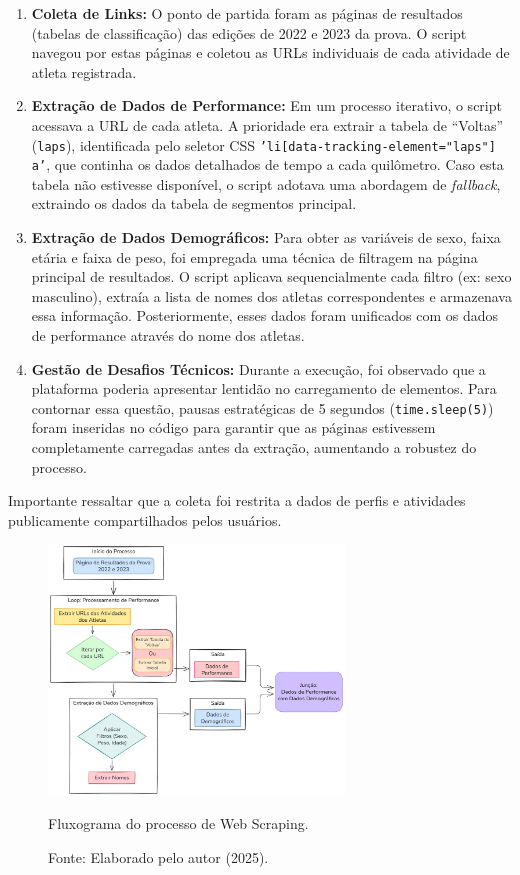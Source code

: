 \begin{enumerate}
    \item \textbf{Coleta de Links:} O ponto de partida foram as páginas de resultados (tabelas de classificação) das edições de 2022 e 2023 da prova. O script navegou por estas páginas e coletou as URLs individuais de cada atividade de atleta registrada.
    
    \item \textbf{Extração de Dados de Performance:} Em um processo iterativo, o script acessava a URL de cada atleta. A prioridade era extrair a tabela de ``Voltas'' (\texttt{laps}), identificada pelo seletor CSS \texttt{'li[data-tracking-element="laps"] a'}, que continha os dados detalhados de tempo a cada quilômetro. Caso esta tabela não estivesse disponível, o script adotava uma abordagem de \emph{fallback}, extraindo os dados da tabela de segmentos principal.
    
    \item \textbf{Extração de Dados Demográficos:} Para obter as variáveis de sexo, faixa etária e faixa de peso, foi empregada uma técnica de filtragem na página principal de resultados. O script aplicava sequencialmente cada filtro (ex: sexo masculino), extraía a lista de nomes dos atletas correspondentes e armazenava essa informação. Posteriormente, esses dados foram unificados com os dados de performance através do nome dos atletas.
    
    \item \textbf{Gestão de Desafios Técnicos:} Durante a execução, foi observado que a plataforma poderia apresentar lentidão no carregamento de elementos. Para contornar essa questão, pausas estratégicas de 5 segundos (\texttt{time.sleep(5)}) foram inseridas no código para garantir que as páginas estivessem completamente carregadas antes da extração, aumentando a robustez do processo.
\end{enumerate}
Importante ressaltar que a coleta foi restrita a dados de perfis e atividades publicamente compartilhados pelos usuários.

\begin{figure}[H]
    \centering
    \includegraphics[width=0.7\textwidth]{Imagens/fluxo_webscraping.png}
    \caption{Fluxograma do processo de Web Scraping.}
    \label{fig:fluxograma_scraping}
    \caption*{Fonte: Elaborado pelo autor (2025).}
\end{figure}

